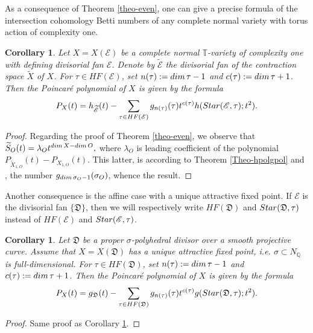 \documentclass[11pt, reqno]{amsart}
\theoremstyle{plain}
\newtheorem{corollary}[theorem]{Corollary}
\theoremstyle{definition}
\theoremstyle{remark}
\begin{document}
As a consequence of Theorem \ref{theo-even}, one can give a precise formula of the intersection cohomology Betti numbers of any complete normal
variety with torus action of complexity one. 
\begin{corollary}\label{coro-Betti-divfan}
Let $X =  X(\mathscr{E})$ be a complete normal $\mathbb{T}$-variety of complexity one with defining divisorial fan $\mathscr{E}$. 
Denote by $\widetilde{\mathscr{E}}$ the divisorial fan of the contraction space $\widetilde{X}$ of $X$. 
For $\tau\in HF(\mathscr{E})$, set $n(\tau):= {\rm dim}\, \tau -1$ and $c(\tau):= {\rm dim}\, \tau +1$. 
Then the 
Poincar\'e polynomial of $X$ is given by the formula
$$P_{X}(t)  =  h_{\widetilde{\mathscr{E}}}(t) -  \sum_{\tau\in HF(\mathscr{E})}g_{n(\tau)}(\tau)t^{c(\tau)}h({\rm Star}(\mathscr{E}, \tau); t^{2}).$$
\end{corollary}
\begin{proof}
Regarding the proof of Theorem \ref{theo-even}, we observe that $\widetilde{S}_{O}(t) =  \lambda_{O}t^{{\rm dim}\, X - {\rm dim}\, O},$ where $\lambda_{O}$ is leading coefficient of the polynomial  $P_{\widetilde{X}_{1, O}}(t) -  P_{X_{1, O}}(t)$. This latter, is according to Theorem \ref{Theo-hpolgpol} and \cite[Proposition 5.6]{AL21},
the number $g_{{\rm dim}\, \sigma_{O}-1}(\sigma_{O})$, whence the result. 
\end{proof}
Another consequence is the affine case with a unique attractive fixed point. If $\mathscr{E}$ is the divisorial fan $\{\mathfrak{D}\}$, then
we will respectively write  $HF(\mathfrak{D})$ and ${\rm Star}(\mathfrak{D}, \tau)$  instead of $HF(\mathscr{E})$ and ${\rm Star}(\mathscr{E}, \tau)$. 
\begin{corollary}\label{corcor-gD-Ic}
Let $\mathfrak{D}$ be a proper $\sigma$-polyhedral divisor over a smooth projective curve. Assume that
$X  =  X(\mathfrak{D})$ has a unique attractive fixed point, i.e. $\sigma\subset N_{\mathbb{Q}}$ is full-dimensional.
For $\tau\in HF(\mathfrak{D})$, set  $n(\tau):= {\rm dim}\, \tau -1$ and $c(\tau):= {\rm dim}\,\tau +1$. 
Then the 
Poincar\'e polynomial of $X$ is given by the formula
$$P_{X}(t) =  g_{\mathfrak{D}}(t) -  \sum_{\tau\in HF(\mathfrak{D})}g_{n(\tau)}(\tau)t^{c(\tau)}g({\rm Star}(\mathfrak{D}, \tau); t^{2}).$$
\end{corollary}
\begin{proof}
Same proof as Corollary \ref{coro-Betti-divfan}.
\end{proof}
\end{document}

